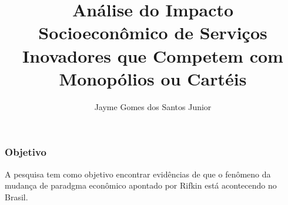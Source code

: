 \documentclass{beamer}
\title[Estatística Aplicada a Geopolítica]{Análise do Impacto Socioeconômico de Serviços Inovadores que Competem com Monopólios ou Cartéis} %
\author{Jayme Gomes dos Santos Junior}
\institute[Universidade Federal do Paraná] 
{
  \inst{}%
  Paulo Afonso Bracarense Costa\\
  Orientador
  }
\date{}
\begin{document}


\begin{frame}
\titlepage %
\end{frame}








\begin{frame}
\frametitle{Objetivo}
\begin{block}

A pesquisa tem como objetivo encontrar evidências
de que o fenômeno da mudança de paradgma econômico
apontado por Rifkin está acontecendo no Brasil.
\end{block}
\end{frame}
\end{document}
